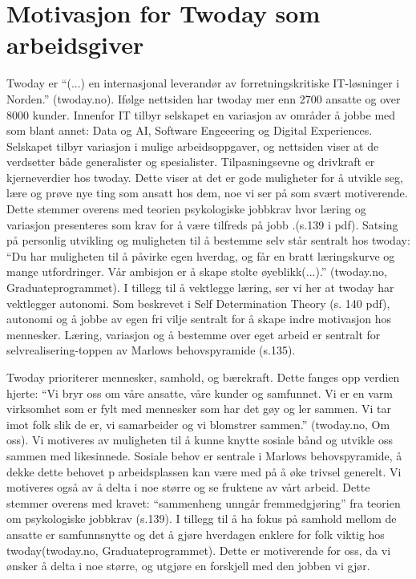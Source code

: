 \section{Motivasjon for Twoday som arbeidsgiver}

Twoday er “(...) en internasjonal leverandør av forretningskritiske IT-løsninger i Norden.” 
(twoday.no). Ifølge nettsiden har twoday mer enn 2700 ansatte og over 8000 kunder. Innenfor IT 
tilbyr selskapet en variasjon av områder å jobbe med som blant annet: Data og AI, Software Engeeering 
og Digital Experiences. Selskapet tilbyr variasjon i mulige arbeidsoppgaver, og nettsiden viser at de
 verdsetter både generalister og spesialister. Tilpasningsevne og drivkraft er kjerneverdier hos twoday.
   Dette viser at det er gode muligheter for å utvikle seg, lære og prøve nye ting som ansatt hos dem, 
   noe vi ser på som svært motiverende. Dette stemmer overens med teorien psykologiske jobbkrav hvor 
   læring og variasjon presenteres som krav for å være tilfreds på jobb \parencite[40]{NRK}.(s.139 i pdf). Satsing på 
   personlig utvikling og muligheten til å bestemme selv står sentralt hos twoday: “Du har muligheten 
   til å påvirke egen hverdag, og får en bratt læringskurve og mange utfordringer. Vår ambisjon er å
    skape stolte øyeblikk(...).” (twoday.no, Graduateprogrammet). I tillegg til å vektlegge læring, ser
    vi her at twoday har vektlegger autonomi. Som beskrevet i Self Determination Theory (s. 140 pdf), 
    autonomi og å jobbe av egen fri vilje sentralt for å skape indre motivasjon hos mennesker. Læring, 
    variasjon og å bestemme over eget arbeid er sentralt for selvrealisering-toppen av Marlows 
    behovspyramide (s.135).


Twoday prioriterer mennesker, samhold, og bærekraft. Dette fanges opp verdien hjerte:
 “Vi bryr oss om våre ansatte, våre kunder og samfunnet. Vi er en varm virksomhet som er fylt 
 med mennesker som har det gøy og ler sammen. Vi tar imot folk slik de er, vi samarbeider og vi 
 blomstrer sammen.” (twoday.no, Om oss). Vi motiveres av muligheten til å kunne knytte sosiale bånd 
 og utvikle oss sammen med likesinnede. Sosiale behov er sentrale i Marlows behovspyramide, å dekke 
 dette behovet p arbeidsplassen kan være med på å øke trivsel generelt. Vi motiveres også av å delta 
 i noe større og se fruktene av vårt arbeid. Dette stemmer overens med kravet: “sammenheng unngår 
 fremmedgjøring” fra teorien om psykologiske jobbkrav (s.139). I tillegg til å ha fokus på samhold 
 mellom de ansatte er samfunnsnytte og det å gjøre hverdagen enklere for folk viktig hos 
 twoday(twoday.no, Graduateprogrammet). Dette er motiverende for oss, da vi ønsker å delta i noe 
 større, og utgjøre en forskjell med den jobben vi gjør.  